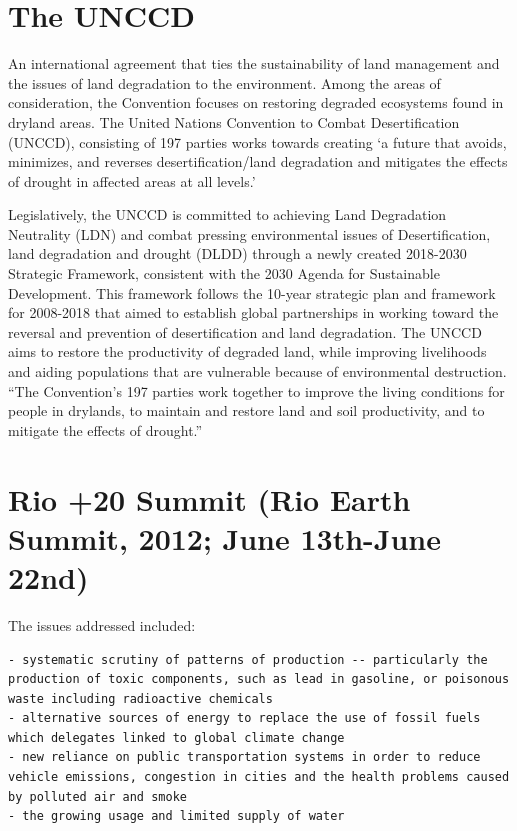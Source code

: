 \documentclass[
  openany]{book}
\begin{document}
\hypertarget{the-unccd}{%
\section{The UNCCD}\label{the-unccd}}

An international agreement that ties the sustainability of land management and the issues of land degradation to the environment. Among the areas of consideration, the Convention focuses on restoring degraded ecosystems found in dryland areas. The United Nations Convention to Combat Desertification (UNCCD), consisting of 197 parties works towards creating `a future that avoids, minimizes, and reverses desertification/land degradation and mitigates the effects of drought in affected areas at all levels.'

Legislatively, the UNCCD is committed to achieving Land Degradation Neutrality (LDN) and combat pressing environmental issues of Desertification, land degradation and drought (DLDD) through a newly created 2018-2030 Strategic Framework, consistent with the 2030 Agenda for Sustainable Development. This framework follows the 10-year strategic plan and framework for 2008-2018 that aimed to establish global partnerships in working toward the reversal and prevention of desertification and land degradation. The UNCCD aims to restore the productivity of degraded land, while improving livelihoods and aiding populations that are vulnerable because of environmental destruction. ``The Convention's 197 parties work together to improve the living conditions for people in drylands, to maintain and restore land and soil productivity, and to mitigate the effects of drought.''

\hypertarget{rio-20-summit-rio-earth-summit-2012-june-13th-june-22nd}{%
\section{Rio +20 Summit (Rio Earth Summit, 2012; June 13th-June 22nd)}\label{rio-20-summit-rio-earth-summit-2012-june-13th-june-22nd}}

The issues addressed included:

\begin{verbatim}
- systematic scrutiny of patterns of production -- particularly the production of toxic components, such as lead in gasoline, or poisonous waste including radioactive chemicals
- alternative sources of energy to replace the use of fossil fuels which delegates linked to global climate change
- new reliance on public transportation systems in order to reduce vehicle emissions, congestion in cities and the health problems caused by polluted air and smoke
- the growing usage and limited supply of water
\end{verbatim}
\end{document}

